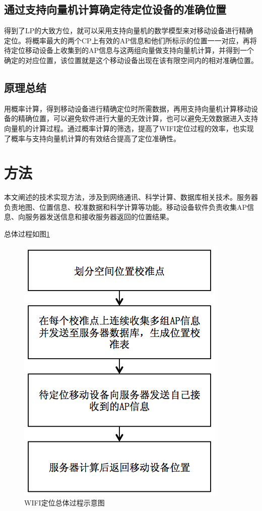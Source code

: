 \documentclass[UTF8, twocolumn ]{ctexart}
\begin{document}
\subsection{通过支持向量机计算确定待定位设备的准确位置}
得到了LP的大致方位，就可以采用支持向量机的数学模型来对移动设备进行精确定位。将概率最大的两个CP上有效的AP信息和他们所标示的位置一一对应，再将待定位移动设备上收集到的AP信息与这两组向量做支持向量机计算，并得到一个确定的对应位置，该位置就是这个移动设备出现在该有限空间内的相对准确位置。
\subsection{原理总结}
用概率计算，得到移动设备进行精确定位时所需数据，再用支持向量机计算移动设备的精确位置，可以避免软件进行大量的无效计算，也可以避免无效数据进入支持向量机的计算过程。通过概率计算的筛选，提高了WIFI定位过程的效率，也实现了概率与支持向量机计算的有效结合提高了定位准确性。


\section{方法}
本文阐述的技术实现方法，涉及到网络通讯、科学计算、数据库相关技术。服务器负责地图、位置信息、校准数据和科学计算等功能。移动设备软件负责收集AP信息、向服务器发送信息和接收服务器返回的位置结果。
\par
总体过程如图\ref{fig:1}
\begin{figure}[!ht]\centering
  \includegraphics[keepaspectratio, scale=0.4]{no1.png}
  \caption{WIFI定位总体过程示意图\label{fig:1}} 
\end{figure}
\end{document}
